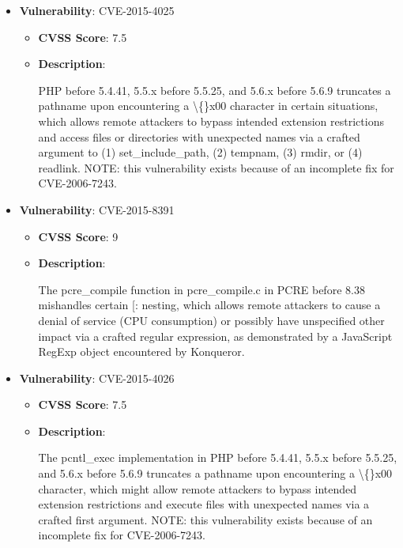 \documentclass{article}
\begin{document}
\begin{itemize}
        \item \textbf{Vulnerability}: CVE-2015-4025
        \begin{itemize}
            \item \textbf{CVSS Score}:  7.5 
            \item \textbf{Description}:
            \parbox[t]{0.9\linewidth}{
                \ttfamily PHP before 5.4.41, 5.5.x before 5.5.25, and 5.6.x before 5.6.9 truncates a pathname upon encountering a \textbackslash\{\}x00 character in certain situations, which allows remote attackers to bypass intended extension restrictions and access files or directories with unexpected names via a crafted argument to (1) set\_include\_path, (2) tempnam, (3) rmdir, or (4) readlink.  NOTE: this vulnerability exists because of an incomplete fix for CVE-2006-7243.
            }
        \end{itemize}
    
        \item \textbf{Vulnerability}: CVE-2015-8391
        \begin{itemize}
            \item \textbf{CVSS Score}:  9 
            \item \textbf{Description}:
            \parbox[t]{0.9\linewidth}{
                \ttfamily The pcre\_compile function in pcre\_compile.c in PCRE before 8.38 mishandles certain [: nesting, which allows remote attackers to cause a denial of service (CPU consumption) or possibly have unspecified other impact via a crafted regular expression, as demonstrated by a JavaScript RegExp object encountered by Konqueror.
            }
        \end{itemize}
    
        \item \textbf{Vulnerability}: CVE-2015-4026
        \begin{itemize}
            \item \textbf{CVSS Score}:  7.5 
            \item \textbf{Description}:
            \parbox[t]{0.9\linewidth}{
                \ttfamily The pcntl\_exec implementation in PHP before 5.4.41, 5.5.x before 5.5.25, and 5.6.x before 5.6.9 truncates a pathname upon encountering a \textbackslash\{\}x00 character, which might allow remote attackers to bypass intended extension restrictions and execute files with unexpected names via a crafted first argument.  NOTE: this vulnerability exists because of an incomplete fix for CVE-2006-7243.
            }
        \end{itemize}
    

\end{itemize}
\end{document}
